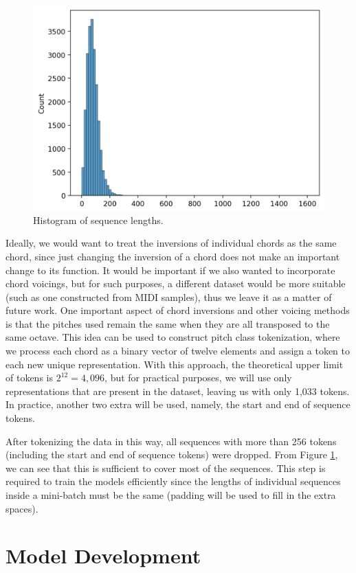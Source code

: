 \documentclass{article}
\begin{document}
\begin{figure}[!htbp]
    \centering
    \includegraphics[width=0.7\linewidth]{images/chord-sequence-lengths.png}
    \caption{Histogram of sequence lengths.}
    \label{fig:chord-sequence-lengths}
\end{figure}

Ideally, we would want to treat the inversions of individual chords as the same chord, since just changing the inversion of a chord does not make an important change to its function. It would be important if we also wanted to incorporate chord voicings, but for such purposes, a different dataset would be more suitable (such as one constructed from MIDI samples), thus we leave it as a matter of future work. One important aspect of chord inversions and other voicing methods is that the pitches used remain the same when they are all transposed to the same octave. This idea can be used to construct pitch class tokenization, where we process each chord as a binary vector of twelve elements and assign a token to each new unique representation. With this approach, the theoretical upper limit of tokens is $2^{12}=4,096$, but for practical purposes, we will use only representations that are present in the dataset, leaving us with only 1,033 tokens. In practice, another two extra will be used, namely, the start and end of sequence tokens. 

After tokenizing the data in this way, all sequences with more than 256 tokens (including the start and end of sequence tokens) were dropped. From Figure \ref{fig:chord-sequence-lengths}, we can see that this is sufficient to cover most of the sequences. This step is required to train the models efficiently since the lengths of individual sequences inside a mini-batch must be the same (padding will be used to fill in the extra spaces).

\section{Model Development}
\end{document}

